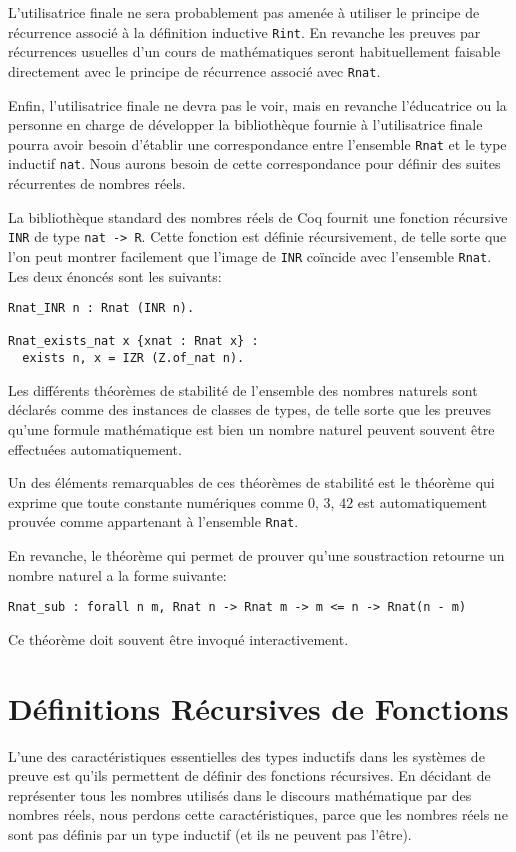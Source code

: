 \documentclass[draft]{jflart}
\begin{document}
L'utilisatrice finale ne sera probablement pas amenée à utiliser le
principe de récurrence associé à la définition inductive \texttt{Rint}.
En revanche les preuves par récurrences usuelles d'un cours de
mathématiques seront habituellement faisable directement avec le
principe de récurrence associé avec \texttt{Rnat}.

Enfin, l'utilisatrice finale ne devra pas le voir, mais en revanche
l'éducatrice ou la personne en charge de développer la bibliothèque
fournie à l'utilisatrice finale pourra avoir besoin d'établir une
correspondance entre l'ensemble \texttt{Rnat} et le type inductif
\texttt{nat}.  Nous aurons besoin de cette correspondance pour définir des
suites récurrentes de nombres réels.

La bibliothèque standard des nombres réels de Coq fournit une fonction
récursive \texttt{INR} de type \texttt{nat -> R}.  Cette fonction est
définie récursivement, de telle sorte que l'on peut montrer facilement
que l'image de \texttt{INR} coïncide avec l'ensemble \texttt{Rnat}.  Les
deux énoncés sont les suivants:
\begin{verbatim}
Rnat_INR n : Rnat (INR n).

Rnat_exists_nat x {xnat : Rnat x} :
  exists n, x = IZR (Z.of_nat n).
\end{verbatim}

Les différents théorèmes de stabilité de l'ensemble des nombres naturels
sont déclarés comme des instances de classes de types, de telle sorte que
les preuves qu'une formule mathématique est bien un nombre naturel peuvent
souvent être effectuées automatiquement.

Un des éléments remarquables de ces théorèmes de stabilité est le théorème
qui exprime que toute constante numériques comme \(0\), \(3\), \(42\) est
automatiquement prouvée comme appartenant à l'ensemble \texttt{Rnat}.

En revanche, le théorème qui permet de prouver qu'une soustraction retourne un
nombre naturel a la forme suivante:
\begin{verbatim}
Rnat_sub : forall n m, Rnat n -> Rnat m -> m <= n -> Rnat(n - m)
\end{verbatim}
Ce théorème doit souvent être invoqué interactivement.
\section{Définitions Récursives de Fonctions}
L'une des caractéristiques essentielles des types inductifs dans les
systèmes de preuve est qu'ils permettent de définir des fonctions
récursives.  En décidant de représenter tous les nombres utilisés dans
le discours mathématique par des nombres réels, nous perdons cette
caractéristiques, parce que les nombres réels ne sont pas définis par
un type inductif (et ils ne peuvent pas l'être).
\end{document}
